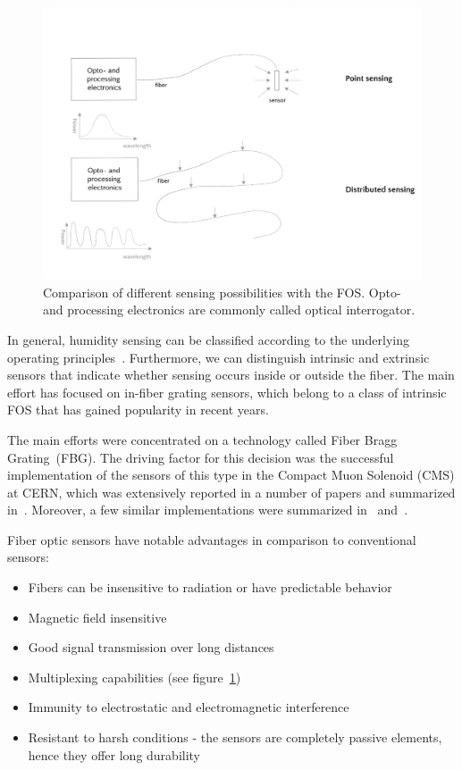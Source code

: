 \begin{figure}[!h]
\centering
\includegraphics[width=0.95\columnwidth]{Chapter5/images/sensing.png}
\caption{Comparison of different sensing possibilities with the \gls{FOS}. Opto- and processing electronics are commonly called optical interrogator.}
\label{fig:sensing}
\end{figure}

In general, humidity sensing can be classified according to the underlying operating principles~\cite{fos_overview}. Furthermore, we can distinguish intrinsic and extrinsic sensors that indicate whether sensing occurs inside or outside the fiber. The main effort has focused on in-fiber grating sensors, which belong to a class of intrinsic \gls{FOS} that has gained popularity in recent years. 

The main efforts were concentrated on a technology called Fiber Bragg Grating~(\gls{FBG}). The driving factor for this decision was the successful implementation of the sensors of this type in the Compact Muon Solenoid (\gls{CMS}) at \gls{CERN}, which was extensively reported in a number of papers and summarized in~\cite{Berruti}. Moreover, a few similar implementations were summarized in~\cite{YEO_PI} and~\cite{Kronenberg:02}. 

Fiber optic sensors have notable advantages in comparison to conventional sensors:

\begin{itemize}
    \item Fibers can be insensitive to radiation or have predictable behavior
    \item Magnetic field insensitive
    \item Good signal transmission over long distances
    \item Multiplexing capabilities (see figure~\ref{fig:sensing})
    \item Immunity to electrostatic and electromagnetic interference
    \item Resistant to harsh conditions - the sensors are completely passive elements, hence they offer long durability
\end{itemize}

